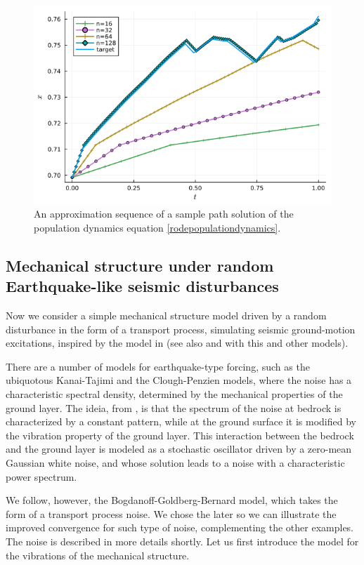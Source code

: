 \documentclass[reqno,12pt]{amsart}
\theoremstyle{plain} %
\theoremstyle{definition} %
\begin{document}
\begin{figure}[htb]
    \includegraphics[scale=0.4]{img/sample_popdyn_gBmPoisson.png}
    \caption{An approximation sequence of a sample path solution of the population dynamics equation \eqref{rodepopulationdynamics}.}
    \label{figsamplepopdyn}
\end{figure}

\subsection{Mechanical structure under random Earthquake-like seismic disturbances}

Now we consider a simple mechanical structure model driven by a random disturbance in the form of a transport process, simulating seismic ground-motion excitations, inspired by the model in \cite{BogdanoffGoldbergBernard1961} (see also \cite[Chapter 18]{NeckelRupp2013} and \cite{HousnerJenning1964} with this and other models).

There are a number of models for earthquake-type forcing, such as the ubiquotous Kanai-Tajimi and the Clough-Penzien models, where the noise has a characteristic spectral density, determined by the mechanical properties of the ground layer. The ideia, from \cite{Kanai1957}, is that the spectrum of the noise at bedrock is characterized by a constant pattern, while at the ground surface it is modified by the vibration property of the ground layer. This interaction between the bedrock and the ground layer is modeled as a stochastic oscillator driven by a zero-mean Gaussian white noise, and whose solution leads to a noise with a characteristic power spectrum.

We follow, however, the Bogdanoff-Goldberg-Bernard model, which takes the form of a transport process noise. We chose the later so we can illustrate the improved convergence for such type of noise, complementing the other examples. The noise is described in more details shortly. Let us first introduce the model for the vibrations of the mechanical structure.
\end{document}
